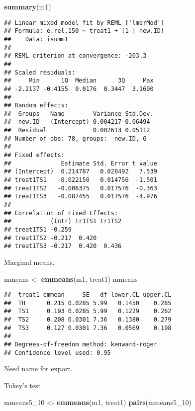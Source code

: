 \documentclass[
]{article}
\newenvironment{Shaded}{\begin{snugshade}}{\end{snugshade}}
\newcommand{\FunctionTok}[1]{\textcolor[rgb]{0.13,0.29,0.53}{\textbf{#1}}}
\newcommand{\NormalTok}[1]{#1}
\newcommand{\OtherTok}[1]{\textcolor[rgb]{0.56,0.35,0.01}{#1}}
\newcommand{\StringTok}[1]{\textcolor[rgb]{0.31,0.60,0.02}{#1}}
\begin{document}
\begin{Shaded}
\begin{Highlighting}[]
\FunctionTok{summary}\NormalTok{(m1)}
\end{Highlighting}
\end{Shaded}

\begin{verbatim}
## Linear mixed model fit by REML ['lmerMod']
## Formula: e.rel.150 ~ treat1 + (1 | new.ID)
##    Data: isumm1
## 
## REML criterion at convergence: -203.3
## 
## Scaled residuals: 
##     Min      1Q  Median      3Q     Max 
## -2.2137 -0.4155  0.0176  0.3447  3.1690 
## 
## Random effects:
##  Groups   Name        Variance Std.Dev.
##  new.ID   (Intercept) 0.004217 0.06494 
##  Residual             0.002613 0.05112 
## Number of obs: 78, groups:  new.ID, 6
## 
## Fixed effects:
##              Estimate Std. Error t value
## (Intercept)  0.214787   0.028492   7.539
## treat1TS1   -0.022150   0.014756  -1.501
## treat1TS2   -0.006375   0.017576  -0.363
## treat1TS3   -0.087455   0.017576  -4.976
## 
## Correlation of Fixed Effects:
##           (Intr) tr1TS1 tr1TS2
## treat1TS1 -0.259              
## treat1TS2 -0.217  0.420       
## treat1TS3 -0.217  0.420  0.436
\end{verbatim}

Marginal means.

\begin{Shaded}
\begin{Highlighting}[]
\NormalTok{mmeans }\OtherTok{\textless{}{-}} \FunctionTok{emmeans}\NormalTok{(m1, }\StringTok{\textquotesingle{}treat1\textquotesingle{}}\NormalTok{)}
\NormalTok{mmeans}
\end{Highlighting}
\end{Shaded}

\begin{verbatim}
##  treat1 emmean     SE   df lower.CL upper.CL
##  TH      0.215 0.0285 5.99   0.1450    0.285
##  TS1     0.193 0.0285 5.99   0.1229    0.262
##  TS2     0.208 0.0301 7.36   0.1380    0.279
##  TS3     0.127 0.0301 7.36   0.0569    0.198
## 
## Degrees-of-freedom method: kenward-roger 
## Confidence level used: 0.95
\end{verbatim}

Need name for export.

Tukey's test

\begin{Shaded}
\begin{Highlighting}[]
\NormalTok{mmeans5\_10 }\OtherTok{\textless{}{-}} \FunctionTok{emmeans}\NormalTok{(m1, }\StringTok{\textquotesingle{}treat1\textquotesingle{}}\NormalTok{)}
\FunctionTok{pairs}\NormalTok{(mmeans5\_10)}
\end{Highlighting}
\end{Shaded}
\end{document}
